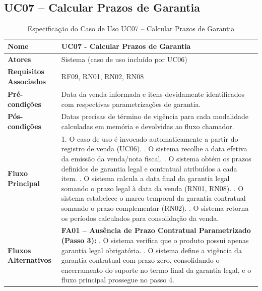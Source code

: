 \subsection{UC07 – Calcular Prazos de Garantia}

\begin{table}[H]
	\centering
	\caption{Especificação do Caso de Uso UC07 – Calcular Prazos de Garantia}
	\label{tab:uc07}
	\begin{tabular}{|p{3.5cm}|p{11.5cm}|}
		\hline
		\textbf{Nome} & UC07 - Calcular Prazos de Garantia \\ \hline
		\textbf{Atores} & Sistema (caso de uso incluído por UC06) \\ \hline
		\textbf{Requisitos Associados} & RF09, RN01, RN02, RN08 \\ \hline
		\textbf{Pré-condições} & Data da venda informada e itens devidamente identificados com respectivas parametrizações de garantia. \\ \hline
		\textbf{Pós-condições} & Datas precisas de término de vigência para cada modalidade calculadas em memória e devolvidas ao fluxo chamador. \\ \hline
		\textbf{Fluxo Principal} & 
		1. O caso de uso é invocado automaticamente a partir do registro de venda (UC06). \newline
		2. O sistema recolhe a data efetiva da emissão da venda/nota fiscal. \newline
		3. O sistema obtém os prazos definidos de garantia legal e contratual atribuídos a cada item. \newline
		4. O sistema calcula a data final da garantia legal somando o prazo legal à data da venda (RN01, RN08). \newline
		5. O sistema estabelece o marco temporal da garantia contratual somando o prazo complementar (RN02). \newline
		6. O sistema retorna os períodos calculados para consolidação da venda. \\ \hline
		\textbf{Fluxos Alternativos} & 
		\textbf{FA01 – Ausência de Prazo Contratual Parametrizado (Passo 3):} \newline
		1. O sistema verifica que o produto possui apenas garantia legal obrigatória. \newline
		2. O sistema define a vigência da garantia contratual com prazo zero, consolidando o encerramento do suporte no termo final da garantia legal, e o fluxo principal prossegue no passo 4. \\ \hline
	\end{tabular}
\end{table}
